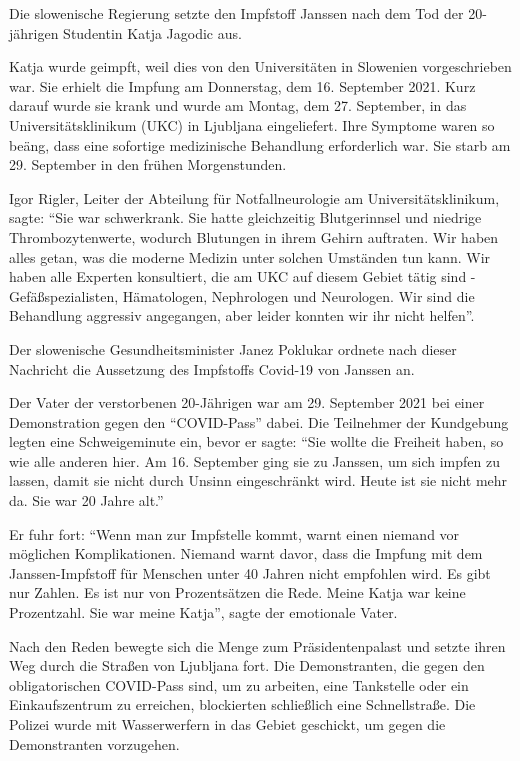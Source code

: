 Die slowenische Regierung setzte den Impfstoff Janssen nach dem Tod der
20-jährigen Studentin Katja Jagodic aus.

Katja wurde geimpft, weil dies von den Universitäten in Slowenien vorgeschrieben
war. Sie erhielt die Impfung am Donnerstag, dem 16. September 2021. Kurz darauf
wurde sie krank und wurde am Montag, dem 27. September, in das
Universitätsklinikum (UKC) in Ljubljana eingeliefert. Ihre Symptome waren so
beäng, dass eine sofortige medizinische Behandlung erforderlich war. Sie starb
am 29. September in den frühen Morgenstunden.

Igor Rigler, Leiter der Abteilung für Notfallneurologie am Universitätsklinikum,
sagte: ``Sie war schwerkrank. Sie hatte gleichzeitig Blutgerinnsel und niedrige
Thrombozytenwerte, wodurch Blutungen in ihrem Gehirn auftraten. Wir haben alles
getan, was die moderne Medizin unter solchen Umständen tun kann. Wir haben alle
Experten konsultiert, die am UKC auf diesem Gebiet tätig sind -
Gefäßspezialisten, Hämatologen, Nephrologen und Neurologen. Wir sind die
Behandlung aggressiv angegangen, aber leider konnten wir ihr nicht helfen''.

Der slowenische Gesundheitsminister Janez Poklukar ordnete nach dieser Nachricht
die Aussetzung des Impfstoffs Covid-19 von Janssen an.

Der Vater der verstorbenen 20-Jährigen war am 29. September 2021 bei einer
Demonstration gegen den ``COVID-Pass'' dabei. Die Teilnehmer der Kundgebung
legten eine Schweigeminute ein, bevor er sagte: ``Sie wollte die Freiheit haben,
so wie alle anderen hier. Am 16. September ging sie zu Janssen, um sich impfen
zu lassen, damit sie nicht durch Unsinn eingeschränkt wird. Heute ist sie nicht
mehr da. Sie war 20 Jahre alt.''

Er fuhr fort: ``Wenn man zur Impfstelle kommt, warnt einen niemand vor möglichen
Komplikationen. Niemand warnt davor, dass die Impfung mit dem Janssen-Impfstoff
für Menschen unter 40 Jahren nicht empfohlen wird. Es gibt nur Zahlen. Es ist
nur von Prozentsätzen die Rede. Meine Katja war keine Prozentzahl. Sie war meine
Katja'', sagte der emotionale Vater.

Nach den Reden bewegte sich die Menge zum Präsidentenpalast und setzte ihren Weg
durch die Straßen von Ljubljana fort. Die Demonstranten, die gegen den
obligatorischen COVID-Pass sind, um zu arbeiten, eine Tankstelle oder ein
Einkaufszentrum zu erreichen, blockierten schließlich eine Schnellstraße. Die
Polizei wurde mit Wasserwerfern in das Gebiet geschickt, um gegen die
Demonstranten vorzugehen.
